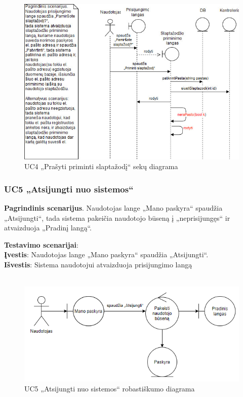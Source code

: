 \documentclass{VUMIFPSbakalaurinis}
\begin{document}
\begin{figure}[H]
	\centering
	\includegraphics[scale=0.6]{img/Sequence/4sequence}
	\caption{UC4 „Prašyti priminti slaptažodį“ sekų diagrama}
	\label{img:uc4seq}
\end{figure}

\subsubsection{UC5 „Atsijungti nuo sistemos“}
\textbf{Pagrindinis scenarijus}. Naudotojas lange „Mano paskyra“ spaudžia „Atsijungti“, tada sistema pakeičia naudotojo būseną į „neprisijungęs“ ir atvaizduoja „Pradinį langą“.
\par \textbf{Testavimo scenarijai}:\\
\textbf{Įvestis}: Naudotojas lange „Mano paskyra“ spaudžia „Atsijungti“. \\
\textbf{Išvestis}: Sistema naudotojui atvaizduoja prisijungimo langą \\ \\

\begin{figure}[H]
	\centering
	\includegraphics[scale=0.6]{img/Robustness/UC5}
	\caption{UC5 „Atsijungti nuo sistemos“ robastiškumo diagrama}
	\label{img:uc5rob}
\end{figure}
\end{document}
